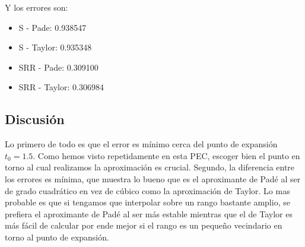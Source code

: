 Y los errores son:

\begin{itemize}
\item S - Pade: 0.938547
\item S - Taylor: 0.935348 
\item SRR - Pade: 0.309100 
\item SRR - Taylor: 0.306984 
\end{itemize}

\newpage 

\subsection{Discusión}

Lo primero de todo es que el error es mínimo cerca del punto de expansión $t_0 = 1.5$. Como hemos visto repetidamente en esta PEC, escoger bien el punto en torno al cual realizamos la aproximación es crucial. Segundo, la diferencia entre los errores es mínima, que muestra lo bueno que es el aproximante de Padé al ser de grado cuadrático en vez de cúbico como la aproximación de Taylor. Lo mas probable es que si tengamos que interpolar sobre un rango bastante amplio, se prefiera el aproximante de Padé al ser más estable mientras que el de Taylor es más fácil de calcular por ende mejor si el rango es un pequeño vecindario en torno al punto de expansión.